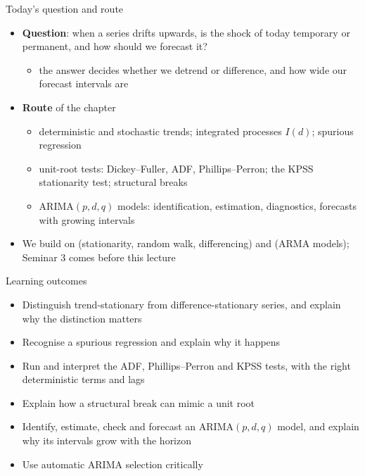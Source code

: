 \begin{frame}{Today's question and route}
\itemsize{\small}
\begin{itemize}
    \item \textbf{Question}: when a series drifts upwards, is the shock of today temporary or permanent, and how should we forecast it?
    \begin{itemize}
        \item the answer decides whether we detrend or difference, and how wide our forecast intervals are
    \end{itemize}
    \item \textbf{Route} of the chapter
    \begin{itemize}
        \item deterministic and stochastic trends; integrated processes $I(d)$; spurious regression
        \item unit-root tests: Dickey--Fuller, ADF, Phillips--Perron; the KPSS stationarity test; structural breaks
        \item ARIMA$(p,d,q)$ models: identification, estimation, diagnostics, forecasts with growing intervals
    \end{itemize}
    \item We build on  (stationarity, random walk, differencing) and  (ARMA models); Seminar 3 comes before this lecture
\end{itemize}
\end{frame}

\begin{frame}{Learning outcomes}
\itemsize{\small}
\begin{itemize}
    \item Distinguish trend-stationary from difference-stationary series, and explain why the distinction matters
    \item Recognise a spurious regression and explain why it happens
    \item Run and interpret the ADF, Phillips--Perron and KPSS tests, with the right deterministic terms and lags
    \item Explain how a structural break can mimic a unit root
    \item Identify, estimate, check and forecast an ARIMA$(p,d,q)$ model, and explain why its intervals grow with the horizon
    \item Use automatic ARIMA selection critically
\end{itemize}
\end{frame}

